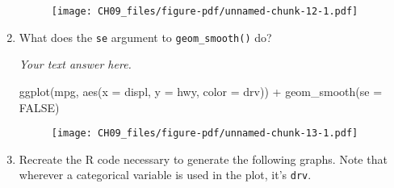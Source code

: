 \documentclass[
  letterpaper,
  DIV=11,
  numbers=noendperiod]{scrreprt}
\newenvironment{Shaded}{\begin{snugshade}}{\end{snugshade}}
\newcommand{\AttributeTok}[1]{\textcolor[rgb]{0.40,0.45,0.13}{#1}}
\newcommand{\ConstantTok}[1]{\textcolor[rgb]{0.56,0.35,0.01}{#1}}
\newcommand{\FunctionTok}[1]{\textcolor[rgb]{0.28,0.35,0.67}{#1}}
\newcommand{\NormalTok}[1]{\textcolor[rgb]{0.00,0.23,0.31}{#1}}
\newcommand{\SpecialCharTok}[1]{\textcolor[rgb]{0.37,0.37,0.37}{#1}}
\begin{document}
\begin{enumerate}
\begin{tcolorbox}
  \begin{figure}[H]

  {\centering \texttt{[image: CH09\_files/figure-pdf/unnamed-chunk-12-1.pdf]}

  }

  \end{figure}

  \end{tcolorbox}
\item
  What does the \texttt{se} argument to \texttt{geom\_smooth()} do?

  \begin{tcolorbox}[enhanced jigsaw, left=2mm, rightrule=.15mm, bottomtitle=1mm, opacitybacktitle=0.6, leftrule=.75mm, opacityback=0, colframe=quarto-callout-note-color-frame, bottomrule=.15mm, coltitle=black, toptitle=1mm, colback=white, titlerule=0mm, colbacktitle=quarto-callout-note-color!10!white, title={Answer}, toprule=.15mm, breakable, arc=.35mm]

  \emph{Your text answer here.}

\begin{Shaded}
\begin{Highlighting}[]
\FunctionTok{ggplot}\NormalTok{(mpg, }\FunctionTok{aes}\NormalTok{(}\AttributeTok{x =}\NormalTok{ displ, }\AttributeTok{y =}\NormalTok{ hwy, }\AttributeTok{color =}\NormalTok{ drv)) }\SpecialCharTok{+}
  \FunctionTok{geom\_smooth}\NormalTok{(}\AttributeTok{se =} \ConstantTok{FALSE}\NormalTok{)}
\end{Highlighting}
\end{Shaded}

  \begin{figure}[H]

  {\centering \texttt{[image: CH09\_files/figure-pdf/unnamed-chunk-13-1.pdf]}

  }

  \end{figure}

  \end{tcolorbox}
\item
  Recreate the R code necessary to generate the following graphs. Note
  that wherever a categorical variable is used in the plot, it's
  \texttt{drv}.

  \begin{figure}

  \begin{minipage}[t]{0.50\linewidth}

  {\centering 

  \raisebox{-\height}{

}}
\end{minipage}
\end{figure}
\end{enumerate}
\end{document}
